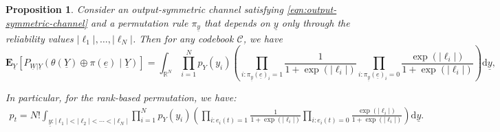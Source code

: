 \documentclass[letterpaper,draftclsnofoot,onecolumn]{IEEEtran}
\newtheorem{proposition}{Proposition}
\begin{document}
\begin{proposition}\label{prop:agp_pi}
    Consider an output-symmetric channel satisfying \eqref{eqn:output-symmetric-channel} and a permutation rule $\pi_{\underline y}$ that depends on $\underline y$ only through the reliability values $|\ell_1|,\ldots,|\ell_N|$. Then for any codebook $\mathcal C$, we have
    \begin{equation}\label{eq:agp_pi}
        \mathbf{E}_{\underline{Y}} \left[P_{\underline{W}|\underline{Y}}(\theta(\underline{Y})\oplus \pi(\underline{e}) \mid \underline{Y})\right] = \int_{\mathbb{R}^N}\prod_{i=1}^{N}p_{Y}(y_i) \left(\prod_{i:\pi_{\underline{y}}(\underline{e})_i = 1} \frac{1}{1+\exp(|\ell_i|)} \prod_{i:\pi_{\underline{y}}(\underline{e})_i = 0} \frac{\exp(|\ell_i|)} {1+\exp(|\ell_i|)}\right)\mathrm{d}\underline{y},
    \end{equation}
    
    In particular, for the rank-based permutation, we have:
    \begin{align}\label{eq:exact_pt}
        p_t = N!\int_{\underline{y}:|\ell_{1}|<|\ell_{2}|<\cdots<|\ell_{N}|}\prod_{i=1}^{N}p_{Y}(y_i)\left(\prod_{i:e_i(t) = 1} \frac{1}{1+\exp(|\ell_i|)} \prod_{i:e_i(t) = 0} \frac{\exp(|\ell_i|)}{1+\exp(|\ell_i|)}\right)\mathrm{d}\underline{y}.
    \end{align}
\end{proposition}
\end{document}
